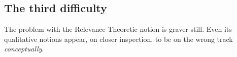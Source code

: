 







\subsection{The third difficulty}

The problem with the Relevance-Theoretic notion is graver still. Even its qualitative notions appear, on closer inspection, to be on the wrong track \emph{conceptually}.

